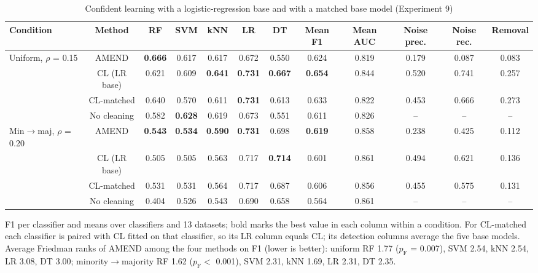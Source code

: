 \documentclass[conference]{IEEEtran}
\begin{document}
\begin{table}[!t]
\centering
\footnotesize
\caption{Confident learning with a logistic-regression base and with a matched base model (Experiment 9)}
\label{tab:8}
\setlength{\tabcolsep}{3.5pt}
\begin{adjustbox}{max width=\linewidth}
\begin{tabular}{lccccccccccc}
\hline
Condition & Method & RF & SVM & kNN & LR & DT & Mean F1 & Mean AUC & Noise prec. & Noise rec. & Removal \\
\hline
Uniform, $\rho $ = 0.15 & AMEND & \textbf{0.666} & 0.617 & 0.617 & 0.672 & 0.550 & 0.624 & 0.819 & 0.179 & 0.087 & 0.083 \\
& CL (LR base) & 0.621 & 0.609 & \textbf{0.641} & \textbf{0.731} & \textbf{0.667} & \textbf{0.654} & 0.844 & 0.520 & 0.741 & 0.257 \\
& CL-matched & 0.640 & 0.570 & 0.611 & \textbf{0.731} & 0.613 & 0.633 & 0.822 & 0.453 & 0.666 & 0.273 \\
& No cleaning & 0.582 & \textbf{0.628} & 0.619 & 0.673 & 0.551 & 0.611 & 0.826 & -- & -- & -- \\
Min$\rightarrow $maj, $\rho $ = 0.20 & AMEND & \textbf{0.543} & \textbf{0.534} & \textbf{0.590} & \textbf{0.731} & 0.698 & \textbf{0.619} & 0.858 & 0.238 & 0.425 & 0.112 \\
& CL (LR base) & 0.505 & 0.505 & 0.563 & 0.717 & \textbf{0.714} & 0.601 & 0.861 & 0.494 & 0.621 & 0.136 \\
& CL-matched & 0.531 & 0.531 & 0.564 & 0.717 & 0.687 & 0.606 & 0.856 & 0.455 & 0.575 & 0.131 \\
& No cleaning & 0.404 & 0.526 & 0.543 & 0.690 & 0.658 & 0.564 & 0.861 & -- & -- & -- \\
\hline
\end{tabular}
\end{adjustbox}
\par\vspace{3pt}
\begin{minipage}{\linewidth}\scriptsize F1 per classifier and means over classifiers and 13 datasets; bold marks the best value in each column within a condition. For CL-matched each classifier is paired with CL fitted on that classifier, so its LR column equals CL; its detection columns average the five base models. Average Friedman ranks of AMEND among the four methods on F1 (lower is better): uniform RF 1.77 ($p_{\mathrm{F}}$ = 0.007), SVM 2.54, kNN 2.54, LR 3.08, DT 3.00; minority$\rightarrow $majority RF 1.62 ($p_{\mathrm{F}} <$ 0.001), SVM 2.31, kNN 1.69, LR 2.31, DT 2.35.\end{minipage}
\end{table}
\end{document}
